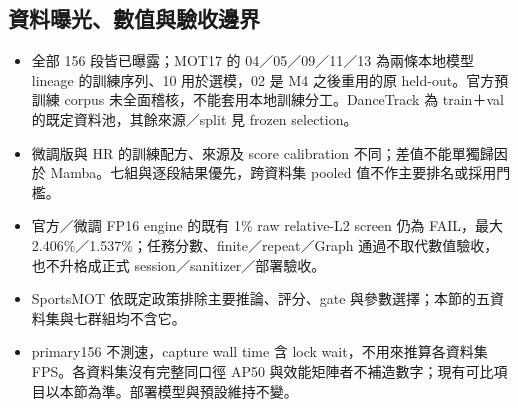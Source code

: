 \subsection{資料曝光、數值與驗收邊界}
\begin{itemize}
\item 全部 156 段皆已曝露；MOT17 的 04／05／09／11／13 為兩條本地模型 lineage 的訓練序列、10 用於選模，02 是 M4 之後重用的原 held-out。官方預訓練 corpus 未全面稽核，不能套用本地訓練分工。DanceTrack 為 train＋val 的既定資料池，其餘來源／split 見 frozen selection。
\item 微調版與 HR 的訓練配方、來源及 score calibration 不同；差值不能單獨歸因於 Mamba。七組與逐段結果優先，跨資料集 pooled 值不作主要排名或採用門檻。
\item 官方／微調 FP16 engine 的既有 1\% raw relative-L2 screen 仍為 FAIL，最大 2.406\%／1.537\%；任務分數、finite／repeat／Graph 通過不取代數值驗收，也不升格成正式 session／sanitizer／部署驗收。
\item SportsMOT 依既定政策排除主要推論、評分、gate 與參數選擇；本節的五資料集與七群組均不含它。
\item primary156 不測速，capture wall time 含 lock wait，不用來推算各資料集 FPS。各資料集沒有完整同口徑 AP50 與效能矩陣者不補造數字；現有可比項目以本節為準。部署模型與預設維持不變。
\end{itemize}
